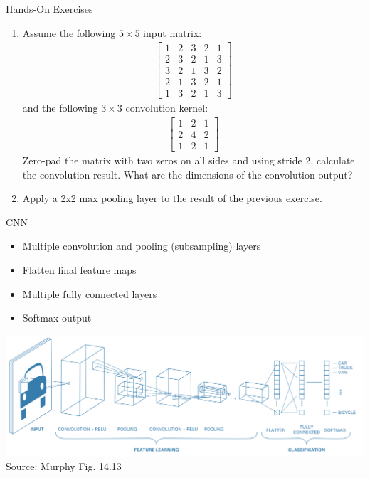 \documentclass[ignorenonframetext,xcolor=x11names]{beamer}
\begin{document}
\begin{frame}{Hands-On Exercises}
\small
\begin{enumerate}
\item Assume the following $5 \times 5$ input matrix:
\begin{align*}
\begin{bmatrix} 1 & 2 & 3 & 2 & 1 \\ 
                2 & 3 & 2 & 1 & 3 \\ 
                3 & 2 & 1 & 3 & 2 \\
                2 & 1 & 3 & 2 & 1 \\               
                1 & 3 & 2 & 1 & 3 
\end{bmatrix}
\end{align*}
and the following $3 \times 3$ convolution kernel:
\begin{align*}
\begin{bmatrix}  1 & 2 & 1 \\ 
                2 & 4 & 2 \\
                1 & 2 & 1 \end{bmatrix}
\end{align*}
Zero-pad the matrix with two zeros on all sides and using stride 2, calculate the convolution result. What are the dimensions of the convolution output?

\item Apply a 2x2 max pooling layer to the result of the previous exercise. 
\end{enumerate}
\end{frame}


\begin{frame}{CNN}
\begin{itemize}
   \item Multiple convolution and pooling (subsampling) layers
   \item Flatten final feature maps
   \item Multiple fully connected layers
   \item Softmax output
\end{itemize}
\vspace{\baselineskip}
\centering
\includegraphics[width=\textwidth]{screen6.png} \\

\scriptsize Source: Murphy Fig. 14.13
\end{frame}
\end{document}
